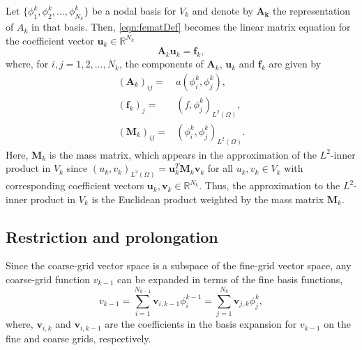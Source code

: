 \documentclass[smallcondensed,final]{svjour3}     %
\begin{document}
Let $\{\phi_1^k,\phi_2^k,\ldots,\phi_{N_k}^k\}$ be a nodal basis for $V_k$ and
denote by $\mathbf{A_k}$ the representation of $A_k$ in that
basis. Then, \eqref{eqn:fematDef} becomes the linear matrix equation
for the coefficient vector $\mathbf{u}_k\in \mathbb{R}^{N_k}$
\begin{equation}
\mathbf{A}_k\mathbf{u}_k = \mathbf{f}_k,
\end{equation}
where, for $i,j = 1,2,\ldots,N_k$, the components of $\mathbf A_k$, $\mathbf u_k$ and $\mathbf f_k$ are given by
\begin{align*}
(\mathbf{A}_k)_{ij} =& a(\phi_i^k,\phi_j^k), \\%
(\mathbf{f}_{k})_j   =& (f,\phi_j^k)_{L^2(\Omega)}, \\%
(\mathbf{M}_k)_{ij} =& (\phi_i^k,\phi_j^k)_{L^2(\Omega)}.
\end{align*}
Here, $\mathbf{M}_k$ is the mass matrix, which appears in the
approximation of the $L^2$-inner product in $V_k$ since
$(u_k,v_k)_{L^2(\Omega)} = \mathbf{u}_k^T\mathbf{M}_k\mathbf{v}_k$ for
all $u_k,v_k\in V_k$ with corresponding coefficient vectors
$\mathbf{u}_k,\mathbf{v}_k\in \mathbb{R}^{N_k}$. Thus, the
approximation to the $L^2$-inner product in $V_k$ is the Euclidean
product weighted by the mass matrix $\mathbf{M}_k$.



\subsection{Restriction and prolongation} %
\label{sub:restriction_&_prolongation}
Since the coarse-grid vector space is a subspace of the fine-grid
vector space, any coarse-grid function $v_{k-1}$ can be expanded in
terms of the fine basis functions,
\begin{equation} 
  v_{k-1} = \sum_{i=1}^{N_{k-1}} \mathbf v_{i,k-1}\phi_i^{k-1} = \sum_{j=1}^{N_k} \mathbf v_{j,k}\phi_j^k, 
\end{equation} 
where, $\mathbf v_{i,k}$ and $\mathbf v_{i,k-1}$ are the coefficients in the basis
expansion for $v_{k-1}$ on the fine and coarse grids, respectively.
\end{document}
